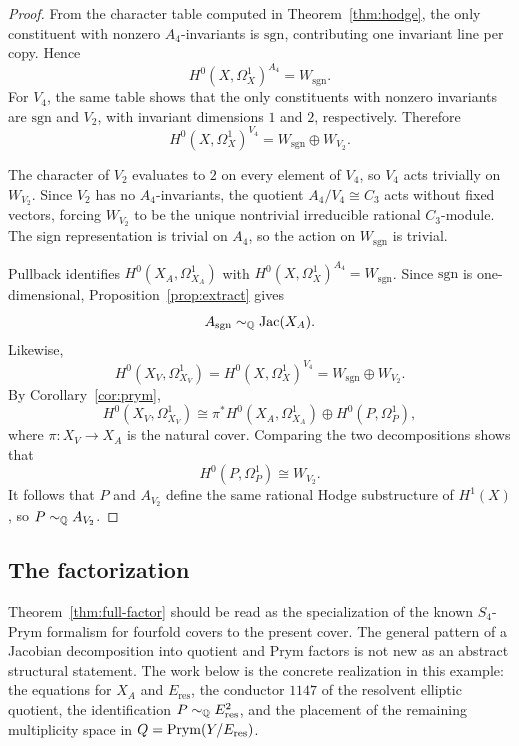 \begin{proof}
From the character table computed in Theorem~\ref{thm:hodge}, the only constituent with nonzero \(A_4\)-invariants is \(\mathrm{sgn}\), contributing one invariant line per copy. Hence
\[
H^0(X,\Omega_X^1)^{A_4}=W_{\mathrm{sgn}}.
\]
For \(V_4\), the same table shows that the only constituents with nonzero invariants are \(\mathrm{sgn}\) and \(V_2\), with invariant dimensions \(1\) and \(2\), respectively. Therefore
\[
H^0(X,\Omega_X^1)^{V_4}=W_{\mathrm{sgn}}\oplus W_{V_2}.
\]

The character of \(V_2\) evaluates to \(2\) on every element of \(V_4\), so \(V_4\) acts trivially on \(W_{V_2}\). Since \(V_2\) has no \(A_4\)-invariants, the quotient \(A_4/V_4\cong C_3\) acts without fixed vectors, forcing \(W_{V_2}\) to be the unique nontrivial irreducible rational \(C_3\)-module. The sign representation is trivial on \(A_4\), so the action on \(W_{\mathrm{sgn}}\) is trivial.

Pullback identifies \(H^0(X_A,\Omega_{X_A}^1)\) with \(H^0(X,\Omega_X^1)^{A_4}=W_{\mathrm{sgn}}\). Since \(\mathrm{sgn}\) is one-dimensional, Proposition~\ref{prop:extract} gives
\[
A_{\mathrm{sgn}}\sim_{\mathbb{Q}}\operatorname{Jac}(X_A).
\]
Likewise,
\[
H^0(X_V,\Omega_{X_V}^1)=H^0(X,\Omega_X^1)^{V_4}=W_{\mathrm{sgn}}\oplus W_{V_2}.
\]
By Corollary~\ref{cor:prym},
\[
H^0(X_V,\Omega_{X_V}^1)\cong \pi^*H^0(X_A,\Omega_{X_A}^1)\oplus H^0(P,\Omega_P^1),
\]
where \(\pi:X_V\to X_A\) is the natural cover. Comparing the two decompositions shows that
\[
H^0(P,\Omega_P^1)\cong W_{V_2}.
\]
It follows that \(P\) and \(A_{V_2}\) define the same rational Hodge substructure of \(H^1(X)\), so \(P\sim_{\mathbb{Q}}A_{V_2}\).
\end{proof}

\subsection{The factorization}

\begin{remark}\label{rem:fourfold-prym-status}
Theorem~\ref{thm:full-factor} should be read as the specialization of the known \(S_4\)-Prym formalism for fourfold covers to the present cover. The general pattern of a Jacobian decomposition into quotient and Prym factors is not new as an abstract structural statement. The work below is the concrete realization in this example: the equations for \(X_A\) and \(E_{\mathrm{res}}\), the conductor \(1147\) of the resolvent elliptic quotient, the identification \(P\sim_{\mathbb{Q}}E_{\mathrm{res}}^2\), and the placement of the remaining multiplicity space in \(Q=\operatorname{Prym}(Y/E_{\mathrm{res}})\).
\end{remark}


